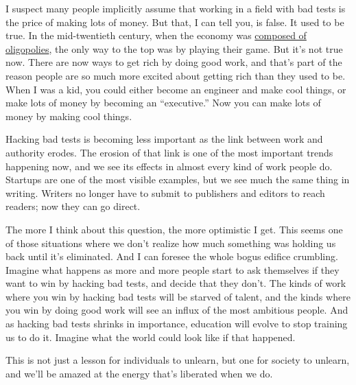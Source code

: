 I suspect many people implicitly assume that working in a field with bad
tests is the price of making lots of money. But that, I can tell you, is
false. It used to be true. In the mid-twentieth century, when the
economy was \href{re.html}{composed of oligopolies}, the only way to the
top was by playing their game. But it's not true now. There are now ways
to get rich by doing good work, and that's part of the reason people are
so much more excited about getting rich than they used to be. When I was
a kid, you could either become an engineer and make cool things, or make
lots of money by becoming an ``executive.'' Now you can make lots of
money by making cool things.

Hacking bad tests is becoming less important as the link between work
and authority erodes. The erosion of that link is one of the most
important trends happening now, and we see its effects in almost every
kind of work people do. Startups are one of the most visible examples,
but we see much the same thing in writing. Writers no longer have to
submit to publishers and editors to reach readers; now they can go
direct.

The more I think about this question, the more optimistic I get. This
seems one of those situations where we don't realize how much something
was holding us back until it's eliminated. And I can foresee the whole
bogus edifice crumbling. Imagine what happens as more and more people
start to ask themselves if they want to win by hacking bad tests, and
decide that they don't. The kinds of work where you win by hacking bad
tests will be starved of talent, and the kinds where you win by doing
good work will see an influx of the most ambitious people. And as
hacking bad tests shrinks in importance, education will evolve to stop
training us to do it. Imagine what the world could look like if that
happened.

This is not just a lesson for individuals to unlearn, but one for
society to unlearn, and we'll be amazed at the energy that's liberated
when we do.


